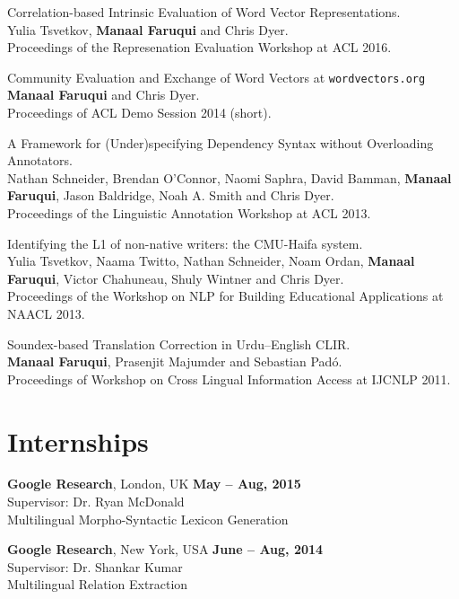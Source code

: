 \documentclass[margin,line]{res}
\begin{document}
\begin{resume}
Correlation-based Intrinsic Evaluation of Word Vector Representations.\\
Yulia Tsvetkov, \textbf{Manaal Faruqui} and Chris Dyer.\\
Proceedings of the Represenation Evaluation Workshop at ACL 2016.

Community Evaluation and Exchange of Word Vectors at \texttt{wordvectors.org}\\
\textbf{Manaal Faruqui} and Chris Dyer.\\
Proceedings of ACL Demo Session 2014 (short).

A Framework for (Under)specifying Dependency Syntax without Overloading Annotators.\\
Nathan Schneider, Brendan O'Connor, Naomi Saphra, David Bamman, \textbf{Manaal Faruqui}, Jason Baldridge, Noah A. Smith and Chris Dyer.\\
Proceedings of the Linguistic Annotation Workshop at ACL 2013.

Identifying the L1 of non-native writers: the CMU-Haifa system.\\
Yulia Tsvetkov, Naama Twitto, Nathan Schneider, Noam Ordan, \textbf{Manaal Faruqui}, Victor Chahuneau, Shuly Wintner and Chris Dyer.\\
Proceedings of the Workshop on NLP for Building Educational Applications at NAACL 2013.

Soundex-based Translation Correction in Urdu--English CLIR.\\
\textbf{Manaal Faruqui}, Prasenjit Majumder and Sebastian Pad\'{o}.\\
Proceedings of Workshop on Cross Lingual Information Access at IJCNLP 2011.

\section{\sc Internships}

{\bf Google Research}, London, UK \hfill {\bf May -- Aug, 2015}\\
Supervisor: Dr. Ryan McDonald \\
Multilingual Morpho-Syntactic Lexicon Generation

{\bf Google Research}, New York, USA \hfill {\bf June -- Aug, 2014}\\
Supervisor: Dr. Shankar Kumar \\
Multilingual Relation Extraction


\end{resume}
\end{document}
